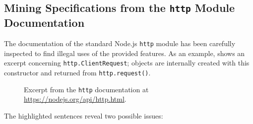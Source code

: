 \subsection{Mining Specifications from the \lstinline{http} Module Documentation}\label{sec:spec-minining}

The documentation of the standard Node.js \lstinline{http} module has been carefully inspected to find illegal uses
of the provided features.
As an example,  shows an excerpt concerning \lstinline{http.ClientRequest};
objects are internally created with this constructor and returned from \lstinline{http.request()}.
\begin{figure}
	\caption{Excerpt from the \lstinline{http} documentation at \url{https://nodejs.org/api/http.html}.}
	\label{fig:httpDoc}
\end{figure}
The highlighted sentences reveal two possible issues:

